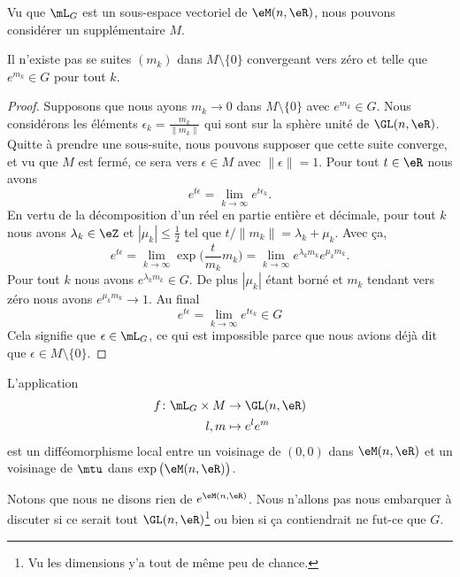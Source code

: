 Vu que \( \mL_G\) est un sous-espace vectoriel de \( \eM(n,\eR)\), nous pouvons considérer un supplémentaire \( M\).

\begin{lemma}   \label{LemHOsbREC}
    Il n'existe pas se suites \( (m_k)\) dans \( M\setminus\{ 0 \}\) convergeant vers zéro et telle que \(  e^{m_k}\in G\) pour tout \( k\).
\end{lemma}

\begin{proof}
    Supposons que nous ayons \( m_k\to 0\) dans \( M\setminus\{ 0 \}\) avec \(  e^{m_k}\in G\). Nous considérons les éléments \( \epsilon_k=\frac{ m_k }{ \| m_k \| }\) qui sont sur la sphère unité de \(\GL(n,\eR)\). Quitte à prendre une sous-suite, nous pouvons supposer que cette suite converge, et vu que \( M\) est fermé, ce sera vers \( \epsilon\in M\) avec \( \| \epsilon \|=1\). Pour tout \( t\in \eR\) nous avons
    \begin{equation}
        e^{t\epsilon}=\lim_{k\to \infty}  e^{t\epsilon_k}.
    \end{equation}
    En vertu de la décomposition d'un réel en partie entière et décimale, pour tout \( k\) nous avons \( \lambda_k\in \eZ\) et \( | \mu_k |\leq \frac{ 1 }{2}\) tel que \( t/\| m_k \|=\lambda_k+\mu_k\). Avec ça,
    \begin{equation}
        e^{t\epsilon}=\lim_{k\to \infty}\exp\Big( \frac{ t }{ m_k }m_k \Big)=\lim_{k\to \infty}  e^{\lambda_km_k} e^{\mu_km_k}.
    \end{equation}
    Pour tout \( k\) nous avons \(  e^{\lambda_km_k}\in G\). De plus \( | \mu_k |\) étant borné et \( m_k\) tendant vers zéro nous avons \(  e^{\mu_km_k}\to 1\). Au final
    \begin{equation}
        e^{t\epsilon}=\lim_{k\to \infty}  e^{t\epsilon_k}\in G
    \end{equation}
    Cela signifie que \( \epsilon\in\mL_G\), ce qui est impossible parce que nous avions déjà dit que \( \epsilon\in M\setminus\{ 0 \}\).
\end{proof}

\begin{lemma}   \label{LemGGTtxdF}
    L'application
    \begin{equation}
        \begin{aligned}
            f\colon \mL_G\times M&\to \GL(n,\eR) \\
            l,m&\mapsto  e^{l} e^{m}
        \end{aligned}
    \end{equation}
    est un difféomorphisme local entre un voisinage de \( (0,0)\) dans \( \eM(n,\eR)\) et un voisinage de \( \mtu\) dans \( \exp\big( \eM(n,\eR) \big)\).
\end{lemma}
Notons que nous ne disons rien de \(  e^{\eM(n,\eR)}\). Nous n'allons pas nous embarquer à discuter si ce serait tout \( \GL(n,\eR)\)\footnote{Vu les dimensions y'a tout de même peu de chance.} ou bien si ça contiendrait ne fut-ce que \( G\).

